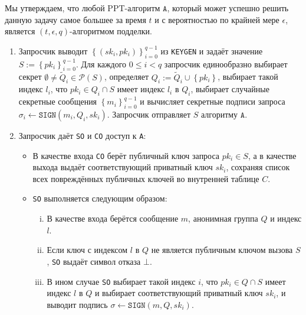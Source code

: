 \documentclass{llncs}
\newcommand{\A}{\texttt{A}}
\begin{document}
\begin{definition}\label{def:ex-unf}
Мы утверждаем, что любой PPT-алгоритм $\A$, который может успешно решить данную задачу самое большее за время $t$ и с вероятностью по крайней мере $\epsilon$, является $(t, \epsilon, q)$-алгоритмом подделки.
\begin{enumerate}

\item Запросчик выводит $\left\{(sk_i, pk_i)\right\}_{i=0}^{q-1}$ из \texttt{KEYGEN} и задаёт значение $S := \left\{pk_i\right\}_{i=0}^{q-1}$. Для каждого $0 \leq i < q$ запросчик единообразно выбирает секрет $\emptyset \neq \widetilde{Q}_i \in \mathcal{P}\left(S\right)$, определяет $Q_i := \widetilde{Q}_i \cup \left\{pk_i\right\}$, выбирает такой индекс $l_i$, что $pk_{i} \in Q_i \cap S$ имеет индекс $l_i$ в $Q_i$, выбирает случайные секретные сообщения $\left\{m_i\right\}_{i=0}^{q-1}$ и вычисляет секретные подписи запроса $\sigma_i \leftarrow \texttt{SIGN}(m_i, Q_i, sk_i)$. Запросчик отправляет $S$ алгоритму $\A$.
\item Запросчик даёт \texttt{SO} и \texttt{CO} доступ к \A:
    \begin{itemize}
    \item В качестве входа \texttt{CO} берёт публичный ключ запроса $pk_i \in S$, а в качестве выхода выдаёт соответствующий приватный ключ $sk_i$, сохраняя список всех повреждённых публичных ключей во внутренней таблице $C$.

    \item \texttt{SO} выполняется следующим образом:
        \begin{enumerate}[(i)]
        \item В качестве входа берётся сообщение $m$, анонимная группа $Q$ и индекс $l$.

        \item Если ключ с индексом $l$ в $Q$ не является публичным ключом вызова $S$, \texttt{SO} выдаёт символ отказа $\bot$.

        \item В ином случае \texttt{SO} выбирает такой индекс $i$, что $pk_{i} \in Q \cap S$ имеет индекс $l$ в $Q$ и выбирает соответствующий приватный ключ $sk_{i}$, и выводит подпись $\sigma \leftarrow \texttt{SIGN}(m, Q, sk_{i})$.
        \end{enumerate}
    \end{itemize}


\end{enumerate}
\end{definition}
\end{document}
